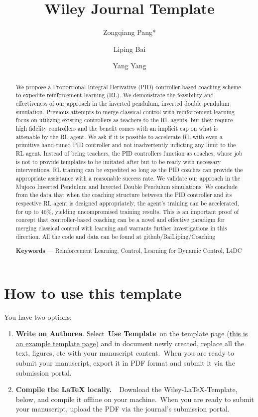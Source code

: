 \documentclass[alpha-refs]{wiley-article}
\title{Wiley Journal Template}
\author[1]{Zongqiang Pang*}
\author[2]{Liping Bai}
\author[3]{Yang Yang}
\providecommand{\tightlist}{\setlength{\itemsep}{0pt}\setlength{\parskip}{0pt}}%
\begin{document}
\maketitle
{}
\begin{abstract}
We propose a Proportional Integral Derivative (PID) controller-based coaching scheme to expedite reinforcement learning (RL). We demonstrate the feasibility and effectiveness of our approach in the inverted pendulum, inverted double pendulum simulation. Previous attempts to merge classical control with reinforcement learning focus on utilizing existing controllers as teachers to the RL agents, but they require high fidelity controllers and the benefit comes with an implicit cap on what is attenable by the RL agent. We ask if it is possible to accelerate RL with even a primitive hand-tuned PID controller and not inadvertently inflicting any limit to the RL agent. Instead of being teachers, the PID controllers function as coaches, whose job is not to provide templates to be imitated after but to be ready with necessary interventions. RL training can be expedited so long as the PID coaches can provide the appropriate assistance with a reasonable success rate. We validate our approach in the Mujoco Inverted Pendulum and Inverted Double Pendulum simulations. We conclude from the data that when the coaching structure between the PID controller and its respective RL agent is designed appropriately, the agent’s training can be accelerated, for up to 46\%, yielding uncompromised training results. This is an important proof of concept that controller-based coaching can be a novel and effective paradigm for merging classical control with learning and warrants further investigations in this direction. All the code and data can be found at github/BaiLiping/Coaching

\textbf{Keywords} --- Reinforcement Learning, Control, Learning for Dynamic Control, L4DC
\end{abstract}%




\section*{How to use this template}

{\label{707961}}

You have two options:

\begin{enumerate}
\tightlist
\item
  \textbf{Write on Authorea}. Select~\textbf{Use Template}~on the
  template page
  (\href{https://www.authorea.com/templates/quarterly_journal_of_the_royal_meteorological_society_qjrms_}{this
  is an example template page}) and in document newly created, replace
  all the text, figures, etc with your manuscript content.~When you are
  ready to submit your manuscript, export it in PDF format and submit it
  via the submission portal.
\item
  \textbf{Compile the LaTeX locally.~}~Download the
  Wiley-LaTeX-Template, below, and compile it offline on your
  machine.~When you are ready to submit your manuscript, upload the PDF
  via the journal's submission portal.
\end{enumerate}
\end{document}
